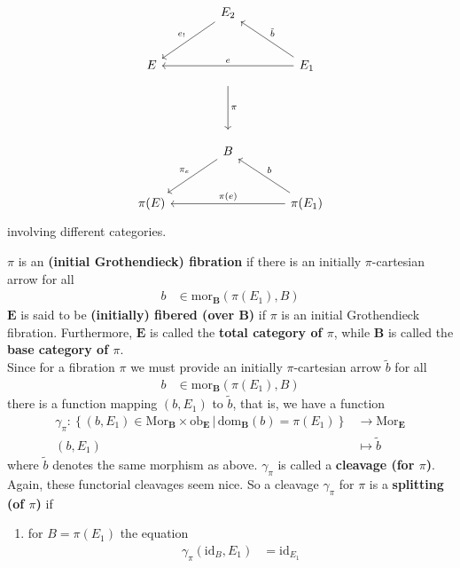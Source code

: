 \begin{enumerate}
\begin{enumerate}
\[\begin{tikzcd}[sep=large]
  &
  E_{2}
  \arrow[swap]{dl}{e_{!}}
  &
  \\
  E
  &
  \arrow[shorten <= 10pt, shorten >= 10pt]{dd}{\pi}
  &
  E_{1}
  \arrow[swap]{ll}{e}
  \arrow[swap]{ul}{\tilde{b}}
  \\
  &
  &
  \\
  &
  B
  \arrow[swap]{dl}{\pi_{e}}
  &
  \\
  \pi(E)
  &
  &
  \pi(E_{1})
  \arrow[swap]{ll}{\pi(e)}
  \arrow[swap]{ul}{b}
\end{tikzcd}
\]
involving different categories.
\end{enumerate}
$\pi$ is an \textbf{(initial Grothendieck) fibration} if there is an initially $\pi$-cartesian arrow for all
\begin{align*}
  b
  &\in
  \mathrm{mor}_{\mathbf{B}}
  \left(
    \pi(E_{1}),
    B
  \right)
\end{align*}
$\mathbf{E}$ is said to be \textbf{(initially) fibered (over $\mathbf{B}$)} if $\pi$ is an initial Grothendieck fibration.
Furthermore, $\mathbf{E}$ is called the \textbf{total category of $\pi$}, while $\mathbf{B}$ is called the \textbf{base category of $\pi$}.
\\
Since for a fibration $\pi$ we must provide an initially $\pi$-cartesian arrow $\tilde{b}$ for all
\begin{align*}
  b
  &\in
  \mathrm{mor}_{\mathbf{B}}
  \left(
    \pi(E_{1}),
    B
  \right)
\end{align*}
there is a function mapping $(b,E_{1})$ to $\tilde{b}$, that is, we have a function
\begin{align*}
  \gamma_{\pi}
  \colon
  \left\lbrace
      (b,E_{1})
      \in
      \mathrm{Mor}_{\mathbf{B}}
      \times
      \mathrm{ob}_{\mathbf{E}}
    \,
    \vert
    \,
      \mathrm{dom}_{\mathbf{B}}(b)
      =
      \pi(E_{1})
  \right\rbrace
  &\rightarrow
  \mathrm{Mor}_{\mathbf{E}}
  \\
  (b,E_{1})
  &\mapsto
  \tilde{b}
\end{align*}
where $\tilde{b}$ denotes the same morphism as above.
$\gamma_{\pi}$ is called a \textbf{cleavage (for $\pi$)}.
Again, these functorial cleavages seem nice.
So a cleavage $\gamma_{\pi}$ for $\pi$ is a \textbf{splitting (of $\pi$)} if
\begin{enumerate}
\item[(IS1)]
for $B = \pi(E_{1})$ the equation
\begin{align*}
  \gamma_{\pi}(\mathrm{id}_{B},E_{1})
  &=
  \mathrm{id}_{E_{1}}
\end{align*}

\end{enumerate}
\end{enumerate}
